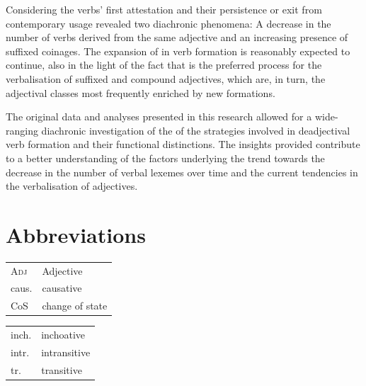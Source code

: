 \documentclass[output=paper,colorlinks,citecolor=brown]{langscibook}
\begin{document}
Considering the verbs’ first attestation and their persistence or exit from contemporary usage revealed two diachronic phenomena: A decrease in the number of verbs derived from the same adjective and an increasing presence of suffixed coinages. The expansion of  in verb formation is reasonably expected to continue, also in the light of the fact that  is the preferred process for the verbalisation of suffixed and compound adjectives, which are, in turn, the adjectival classes most frequently enriched by new formations.

The original data and analyses presented in this research allowed for a wide-ranging diachronic investigation of the  of the strategies involved in deadjectival verb formation and their functional distinctions. The insights provided contribute to a better understanding of the factors underlying the trend towards the decrease in the number of verbal lexemes over time and the current tendencies in the verbalisation of adjectives.

\section*{Abbreviations}
\begin{tabularx}{.45\textwidth}{lQ}
\textsc{Adj} & Adjective\\
caus. & causative\\
CoS & change of state\\
\end{tabularx}
\begin{tabularx}{.45\textwidth}{lQ}
inch. & inchoative\\
intr. & intransitive\\
tr. & transitive\\
\end{tabularx}

\sloppy\printbibliography[heading=subbibliography,notkeyword=this]
\end{document}
